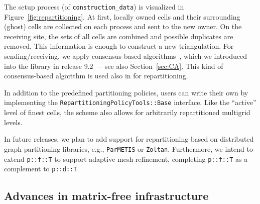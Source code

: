 \documentclass{ansarticle-preprint}
\begin{document}
The setup process (of \texttt{construction\_data}) is visualized in Figure~\ref{fig:repartitioning}. At
first, locally owned cells and their
surrounding (ghost) cells are collected on each process and
sent to the new owner. On the
receiving site, the sets of all cells are combined and possible duplicates
are removed. This information is enough to construct a new triangulation.
For sending/receiving, we apply consensus-based algorithms~\cite{hoefler2010scalable}, which
we introduced into the library in release 9.2~\cite{dealII92} -- see
also Section~\ref{sec:CA}. This kind of consensus-based
algorithm is used also in \cite{ibanez2016pumi} for repartitioning.

In addition to the predefined partitioning policies, users
can write their own by implementing the
\texttt{RepartitioningPolicyTools::Base} interface. Like the
``active'' level of finest cells, the scheme also allows for
arbitrarily repartitioned multigrid levels.

In future releases, we plan to add support for repartitioning based on distributed graph
partitioning libraries, e.g., \texttt{ParMETIS} or \texttt{Zoltan}. Furthermore, we intend to extend
\texttt{p::f::T} to support adaptive mesh refinement, completing \texttt{p::f::T}
as a complement to \texttt{p::d::T}.



\subsection{Advances in matrix-free infrastructure}\label{sec:mf}
\end{document}

